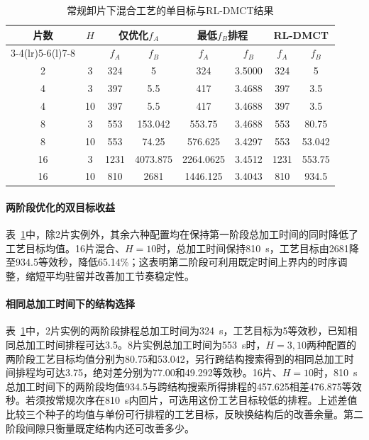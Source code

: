 \documentclass[final,5p,times,twocolumn]{elsarticle}
\begin{document}
\begin{table}[!htbp]\centering\small
\caption{常规卸片下混合工艺的单目标与RL-DMCT结果}
\label{tab:matched-objectives-cn}
\setlength{\tabcolsep}{3.3pt}
\begin{tabular}{@{}*{8}{c}@{}}\toprule
\multirow{2}{*}{片数} & \multirow{2}{*}{$H$} & \multicolumn{2}{c}{仅优化$f_A$} & \multicolumn{2}{c}{最低$f_B$排程} & \multicolumn{2}{c}{RL-DMCT}\\
\cmidrule(lr){3-4}\cmidrule(lr){5-6}\cmidrule(l){7-8}
 & & $f_A$ & $f_B$ & $f_A$ & $f_B$ & $f_A$ & $f_B$\\\midrule
2 & 3 & 324 & 5 & 324 & 3.5000 & 324 & 5\\
4 & 3 & 397 & 5.5 & 417 & 3.4688 & 397 & 3.5\\
4 & 10 & 397 & 5.5 & 417 & 3.4688 & 397 & 3.5\\
8 & 3 & 553 & 153.042 & 553.75 & 3.4688 & 553 & 80.75\\
8 & 10 & 553 & 74.25 & 576.625 & 3.4297 & 553 & 53.042\\
16 & 3 & 1231 & 4073.875 & 2264.0625 & 3.4512 & 1231 & 553.75\\
16 & 10 & 810 & 2681 & 1446.125 & 3.4043 & 810 & 934.5\\
\bottomrule\end{tabular}\end{table}

\paragraph{两阶段优化的双目标收益}
表~\ref{tab:matched-objectives-cn}中，除2片实例外，其余六种配置均在保持第一阶段总加工时间的同时降低了工艺目标均值。16片混合、$H=10$时，总加工时间保持810~s，工艺目标由2681降至934.5等效秒，降低65.14\%；这表明第二阶段可利用既定时间上界内的时序调整，缩短平均驻留并改善加工节奏稳定性。

\paragraph{相同总加工时间下的结构选择}
表~\ref{tab:matched-objectives-cn}中，2片实例的两阶段排程总加工时间为324~s，工艺目标为5等效秒，已知相同总加工时间排程可达3.5。8片实例总加工时间为553~s时，$H=3,10$两种配置的两阶段工艺目标均值分别为80.75和53.042，另行跨结构搜索得到的相同总加工时间排程均可达3.75，绝对差分别为77.00和49.292等效秒。16片、$H=10$时，810~s总加工时间下的两阶段均值934.5与跨结构搜索所得排程的457.625相差476.875等效秒。若须按常规次序在810~s内回片，可选用这份工艺目标较低的排程。上述差值比较三个种子的均值与单份可行排程的工艺目标，反映换结构后的改善余量。第二阶段间隙只衡量既定结构内还可改善多少。
\end{document}
